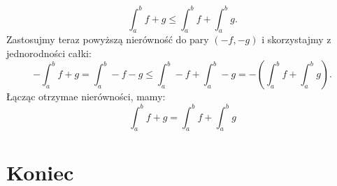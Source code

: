 \documentclass{article}
\numberwithin{defi}{section}
\numberwithin{defi}{section}
\renewcommand{\leq}{\leqslant}
\begin{document}
\begin{dow}{}
\begin{equation*}
        \int_{a}^{b} f + g \leq \int_{a}^{b} f +  \int_{a}^{b} g.
    \end{equation*} Zastosujmy teraz powyższą nierówność do pary $(-f, -g)$ i skorzystajmy z jednorodności całki: \begin{equation}
        -\int_{a}^{b} f + g = \int_{a}^{b} -f - g \leq \int_{a}^{b} -f   + \int_{a}^{b} -g =-(\int_{a}^{b} f   + \int_{a}^{b} g).
    \end{equation} Łącząc otrzymae nierówności, mamy: \begin{equation*}
        \int_{a}^{b} f + g = \int_{a}^{b} f   + \int_{a}^{b} g
    \end{equation*}

\end{dow}

\newpage
\section*{Koniec}
\newpage
\tableofcontents
\end{document}
